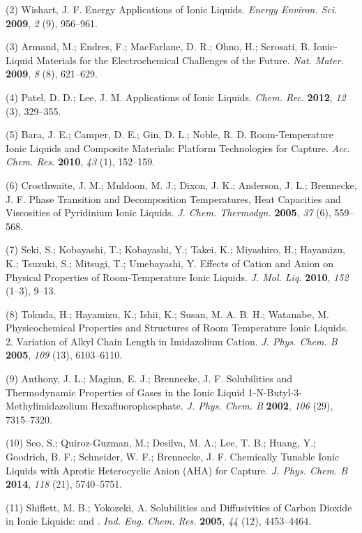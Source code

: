\documentclass[]{article}
\begin{document}
(2) Wishart, J. F. Energy Applications of Ionic Liquids. \emph{Energy Environ. Sci.} \textbf{2009}, \emph{2} (9), 956--961.

(3) Armand, M.; Endres, F.; MacFarlane, D. R.; Ohno, H.; Scrosati, B.  Ionic-Liquid Materials for the Electrochemical Challenges of the Future.  \emph{Nat. Mater.} \textbf{2009}, \emph{8} (8), 621--629.

(4) Patel, D. D.; Lee, J. M. Applications of Ionic Liquids. \emph{Chem.  Rec.} \textbf{2012}, \emph{12} (3), 329--355.

(5) Bara, J. E.; Camper, D. E.; Gin, D. L.; Noble, R. D.  Room-Temperature Ionic Liquids and Composite Materials: Platform Technologies for  Capture. \emph{Acc. Chem. Res.}  \textbf{2010}, \emph{43} (1), 152--159.

(6) Crosthwaite, J. M.; Muldoon, M. J.; Dixon, J. K.; Anderson, J. L.; Brennecke, J. F. Phase Transition and Decomposition Temperatures, Heat Capacities and Viscosities of Pyridinium Ionic Liquids. \emph{J. Chem.  Thermodyn.} \textbf{2005}, \emph{37} (6), 559--568.

(7) Seki, S.; Kobayashi, T.; Kobayashi, Y.; Takei, K.; Miyashiro, H.; Hayamizu, K.; Tsuzuki, S.; Mitsugi, T.; Umebayashi, Y. Effects of Cation and Anion on Physical Properties of Room-Temperature Ionic Liquids.  \emph{J. Mol. Liq.} \textbf{2010}, \emph{152} (1--3), 9--13.

(8) Tokuda, H.; Hayamizu, K.; Ishii, K.; Susan, M. A. B. H.; Watanabe, M. Physicochemical Properties and Structures of Room Temperature Ionic Liquids. 2. Variation of Alkyl Chain Length in Imidazolium Cation.  \emph{J. Phys. Chem. B} \textbf{2005}, \emph{109} (13), 6103--6110.

(9) Anthony, J. L.; Maginn, E. J.; Brennecke, J. F. Solubilities and Thermodynamic Properties of Gases in the Ionic Liquid 1-N-Butyl-3-Methylimidazolium Hexafluorophosphate. \emph{J. Phys. Chem.  B} \textbf{2002}, \emph{106} (29), 7315--7320.

(10) Seo, S.; Quiroz-Guzman, M.; Desilva, M. A.; Lee, T. B.; Huang, Y.; Goodrich, B. F.; Schneider, W. F.; Brennecke, J. F. Chemically Tunable Ionic Liquids with Aprotic Heterocyclic Anion (AHA) for  Capture. \emph{J. Phys. Chem. B} \textbf{2014}, \emph{118} (21), 5740--5751.

(11) Shiflett, M. B.; Yokozeki, A. Solubilities and Diffusivities of Carbon Dioxide in Ionic Liquids: \ce{[bmim][PF6]} and \ce{[bmim][BF4]}. \emph{Ind. Eng. Chem. Res.}  \textbf{2005}, \emph{44} (12), 4453--4464.
\end{document}
